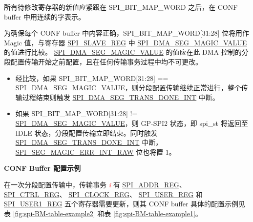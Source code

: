 \documentclass[main\_\_CN.tex]{subfiles}
\begin{document}
所有待修改寄存器的新值应紧跟在 SPI\_BIT\_MAP\_WORD 之后，在 CONF buffer 中用连续的字表示。

为确保每个 CONF buffer 中内容正确，SPI\_BIT\_MAP\_WORD[31:28] 位将用作 Magic 值，与寄存器 \hyperref[regdesc:SPISLAVEREG]{SPI\_SLAVE\_REG} 中 \hyperref[fielddesc:SPIDMASEGMAGICVALUE]{SPI\_DMA\_SEG\_MAGIC\_VALUE} 的值进行比较。 \hyperref[fielddesc:SPIDMASEGMAGICVALUE]{SPI\_DMA\_SEG\_MAGIC\_VALUE} 的值应在此 DMA 控制的分段配置传输开始之前配置，且在任何传输事务过程中均不可更改。

    \begin{itemize}
        \item 经比较，如果 SPI\_BIT\_MAP\_WORD[31:28] == \hyperref[fielddesc:SPIDMASEGMAGICVALUE]{SPI\_DMA\_SEG\_MAGIC\_VALUE}，则分段配置传输继续正常进行，整个传输过程结束则触发 \hyperref[int:SPIDMASEGTRANSDONEINT]{SPI\_DMA\_SEG\_TRANS\_DONE\_INT} 中断。
        \item 如果 SPI\_BIT\_MAP\_WORD[31:28] != \hyperref[fielddesc:SPIDMASEGMAGICVALUE]{SPI\_DMA\_SEG\_MAGIC\_VALUE}，则 GP-SPI2 状态，即 spi\_st 将返回至 IDLE 状态，分段配置传输立即结束。同时触发 \hyperref[int:SPIDMASEGTRANSDONEINT]{SPI\_DMA\_SEG\_TRANS\_DONE\_INT} 中断， \hyperref[fielddesc:SPISEGMAGICERRINTRAW]{SPI\_SEG\_MAGIC\_ERR\_INT\_RAW} 位也将置 1。
    \end{itemize}

\textbf{CONF Buffer 配置示例}\label{sec:gp-spi2-sct-conf-buffer}

在一次分段配置传输中，传输事务  \textcolor{red}{\it i} 有 \hyperref[regdesc:SPIADDRREG]{SPI\_ADDR\_REG}、 \hyperref[regdesc:SPICTRLREG]{SPI\_CTRL\_REG}、 \hyperref[regdesc:SPICLOCKREG]{SPI\_CLOCK\_REG}、
\hyperref[regdesc:SPIUSERREG]{SPI\_USER\_REG} 和
\hyperref[regdesc:SPIUSER1REG]{SPI\_USER1\_REG} 五个寄存器需要更新，则其 CONF buffer 具体的配置示例见表 \ref{fig:spi-BM-table-example2} 和表 \ref{fig:spi-BM-table-example1}。
\end{document}

